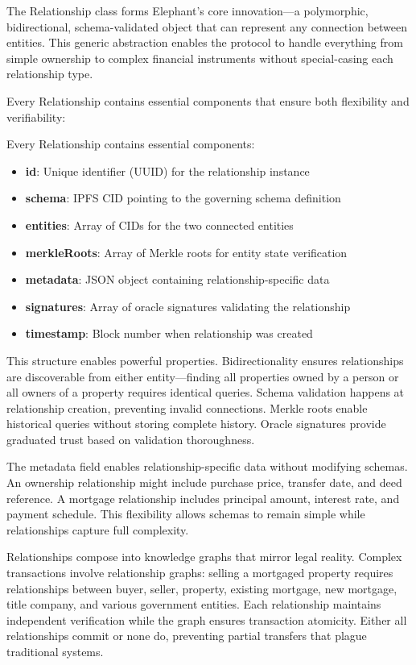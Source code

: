 The Relationship class forms Elephant's core innovation—a polymorphic, bidirectional, schema-validated object that can represent any connection between entities. This generic abstraction enables the protocol to handle everything from simple ownership to complex financial instruments without special-casing each relationship type.

Every Relationship contains essential components that ensure both flexibility and verifiability:

Every Relationship contains essential components:
\begin{itemize}
\item \textbf{id}: Unique identifier (UUID) for the relationship instance
\item \textbf{schema}: IPFS CID pointing to the governing schema definition
\item \textbf{entities}: Array of CIDs for the two connected entities
\item \textbf{merkleRoots}: Array of Merkle roots for entity state verification
\item \textbf{metadata}: JSON object containing relationship-specific data
\item \textbf{signatures}: Array of oracle signatures validating the relationship
\item \textbf{timestamp}: Block number when relationship was created
\end{itemize}

This structure enables powerful properties. Bidirectionality ensures relationships are discoverable from either entity—finding all properties owned by a person or all owners of a property requires identical queries. Schema validation happens at relationship creation, preventing invalid connections. Merkle roots enable historical queries without storing complete history. Oracle signatures provide graduated trust based on validation thoroughness.

The metadata field enables relationship-specific data without modifying schemas. An ownership relationship might include purchase price, transfer date, and deed reference. A mortgage relationship includes principal amount, interest rate, and payment schedule. This flexibility allows schemas to remain simple while relationships capture full complexity.

Relationships compose into knowledge graphs that mirror legal reality. Complex transactions involve relationship graphs: selling a mortgaged property requires relationships between buyer, seller, property, existing mortgage, new mortgage, title company, and various government entities. Each relationship maintains independent verification while the graph ensures transaction atomicity. Either all relationships commit or none do, preventing partial transfers that plague traditional systems.

